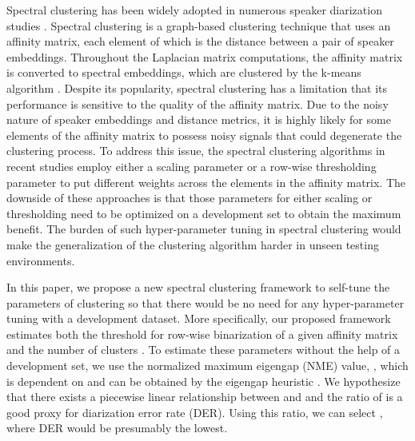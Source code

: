 \documentclass[journal]{IEEEtran}
\begin{document}
Spectral clustering has been widely adopted in numerous speaker diarization studies \cite{ning2006spectral, luque2012, shum2012use, shum2013unsupervised, wang2018speaker, qingjian2019}. Spectral clustering is a graph-based clustering technique that uses an affinity matrix, each element of which is the distance between a pair of speaker embeddings. Throughout the Laplacian matrix computations, the affinity matrix is converted to spectral embeddings, which are clustered by the k-means algorithm \cite{lloyd1982least}. Despite its popularity, spectral clustering has a limitation that its performance is sensitive to the quality of the affinity matrix. Due to the noisy nature of speaker embeddings and distance metrics, it is highly likely for some elements of the affinity matrix to possess noisy signals that could degenerate the clustering process. To address this issue, the spectral clustering algorithms in recent studies employ either a scaling parameter \cite{ning2006spectral, shum2012use, luque2012} or a row-wise thresholding parameter \cite{wang2018speaker} to put different weights across the elements in the affinity matrix. The downside of these approaches is that those parameters for either scaling or thresholding need to be optimized on a development set to obtain the maximum benefit. The burden of such hyper-parameter tuning in spectral clustering would make the generalization of the clustering algorithm harder in unseen testing environments. 

In this paper, we propose a new spectral clustering framework to self-tune the parameters of clustering so that there would be no need for any hyper-parameter tuning with a development dataset. More specifically, our proposed framework estimates both the threshold  for row-wise binarization of a given affinity matrix and the number of clusters . To estimate these parameters without the help of a development set, we use the normalized maximum eigengap (NME) value,  , which is dependent on  and can be obtained by the eigengap heuristic \cite{von2007tutorial}. We hypothesize that there exists a piecewise linear relationship between  and  and the ratio of  is a good proxy for diarization error rate (DER). Using this ratio, we can select , where DER would be presumably the lowest. 
\end{document}
